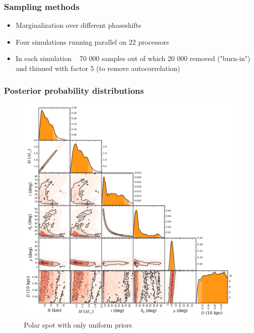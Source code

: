 \documentclass{beamer}
\begin{document}
\fi

\begin{frame}
\frametitle{Sampling methods}
\begin{itemize}
\item Marginalization over different phaseshifts
\item Four simulations running parallel on 22 processors
\item In each simulation ~ 70 000 samples out of which 20 000 removed ("burn-in") and thinned with factor 5 (to remove autocorrelation)

\end{itemize}

\end{frame}



\begin{frame}
\frametitle{Posterior probability distributions}

\begin{figure}
\includegraphics[width=0.5\linewidth]{fpolf.pdf}
\caption{Polar spot with only uniform priors}
\end{figure}

\end{frame}


\end{document}
